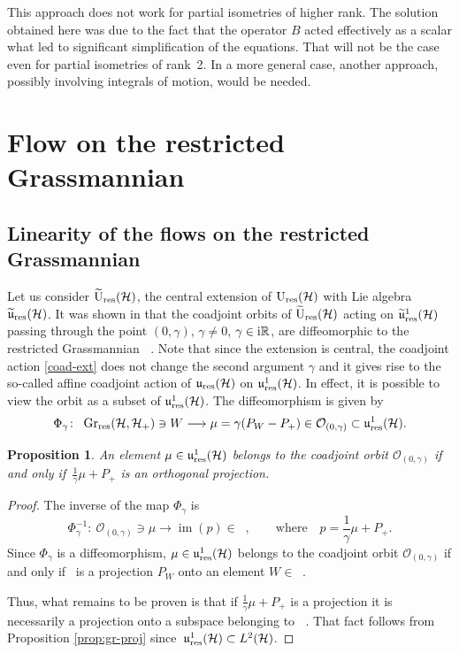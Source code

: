 \documentclass[10pt,a4paper]{amsart}
\newtheorem{prop}[thm]{Proposition}
\theoremstyle{definition}
\numberwithin{equation}{section}
\newcommand{\R}{\mathbb R}
\renewcommand{\H}{\mathcal{H}}
\DeclareMathOperator{\Gr}{Gr_{res}(\H,\H_+)}
\newcommand{\Ur}{\mathrm{U}_{\textnormal{res}}(\H)}
\newcommand{\Urt}{\widetilde{\mathrm{U}}_{\textnormal{res}}(\H)}
\newcommand{\ur}{\mathfrak u_{\textnormal{res}}(\H)}
\newcommand{\urp}{\mathfrak u_{\textnormal{res}}^1(\H)}
\newcommand{\urt}{\widetilde{\mathfrak u}_{\textnormal{res}}(\H)}
\newcommand{\urtp}{\widetilde{\mathfrak u}_{\textnormal{res}}^1(\H)}
\DeclareMathOperator{\im}{im}
\newcommand{\Ld}{L^2(\H)}
\newcommand{\tto}{\longrightarrow}
\newcommand{\be}{\begin{equation}}
\newcommand{\ee}{\end{equation}}
\begin{document}
This approach does not work for partial isometries of higher rank. The solution obtained here was due to the fact that the operator $B$ acted effectively as a scalar what led to significant simplification of the equations. That will not be the case even for partial isometries of rank~2. In a more general case, another approach, possibly involving integrals of motion, would be needed.

\section[Flow on the restricted Grassmannian Gr]{Flow on the restricted Grassmannian $\boldsymbol{\Gr}$}\label{sec:gr-lin}

\subsection{Linearity of the flows on the restricted Grassmannian}
Let us consider $\Urt$, the central extension of $\Ur$ with Lie algebra $\urt$.
It was shown in \cite[Theorem 2.13]{Ratiu-grass} that the coadjoint orbits of $\Urt$ acting on $\urtp$ passing through the point $(0,\gamma)$, $\gamma\neq 0$, $\gamma\in {\rm i}\R$, are diffeomorphic to the restricted Grassmannian $\Gr$. Note that since the extension is central, the coadjoint action \eqref{coad-ext} does not change the second argument $\gamma$ and it gives rise to the so-called affine coadjoint action of $\ur$ on $\urp$. In effect, it is possible to view the orbit as a subset of $\urp$. The diffeomorphism is given by
\[
 \Phi_\gamma \colon\ \Gr \ni W \tto \mu = \gamma (P_W - P_+) \in \mathcal O_{(0,\gamma)}\subset \urp. \]
\begin{prop}
An element $\mu\in\urp$ belongs to the coadjoint orbit $\mathcal{O}_{(0,\gamma)}$ if and only if~$\frac{1}{\gamma}\mu + P_+$ is an orthogonal projection.
\end{prop}
\begin{proof}
The inverse of the map $\Phi_\gamma$ is
\be \label{phiGammaInverse}
 \Phi_\gamma^{-1}\colon\ \mathcal{O}_{(0,\gamma)} \ni \mu \tto \im(p) \in \Gr,\qquad\textrm{where}\quad p = \frac{1}{\gamma}\mu + P_+.
 \ee
Since $\Phi_\gamma$ is a diffeomorphism, $\mu\in\urp$ belongs to the coadjoint orbit $\mathcal{O}_{(0,\gamma)}$ if and only if~ is a projection $P_W$ onto an element $W\in \Gr$.

Thus, what remains to be proven is that if $\frac{1}{\gamma}\mu + P_+$ is a projection it is necessarily a projection onto a subspace belonging to $\Gr$. That fact follows from Proposition \ref{prop:gr-proj} since~${\urp\subset \Ld}$.
\end{proof}
\end{document}
